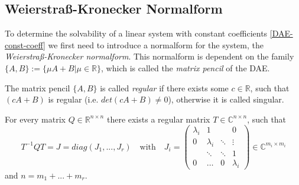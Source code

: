 \subsection{Weierstraß-Kronecker Normalform}
\label{chap:Weierstraß-Kronecker Normalform}

To determine the solvability of a linear system with constant coefficients \eqref{DAE-const-coeff} we first need to introduce a normalform for the system, the \emph{Weierstraß-Kronecker normalform}. This normalform is dependent on the family $\{A,B\} := \{ \mu A+B|\mu \in \mathbb{R} \}$, which is called the  \emph{matrix pencil} of the DAE.

\begin{definition}
	The matrix pencil $\{ A,B\}$ is called \emph{regular} if there exists some $c \in \mathbb{R}$, such that $(cA+B)$ is regular (i.e. $det(cA+B) \neq 0$), otherwise it is called singular.
\end{definition}

\begin{theorem}
	For every matrix $Q \in \mathbb{R}^{n \times n}$ there exists a regular matrix $T \in \mathbb{C}^{n \times n}$, such that
	\begin{displaymath}
		T^{-1}QT = J = diag(J_1, ..., J_r) \quad \text{with} \quad J_i = 
		\left(
		\begin{matrix}
			\lambda_i & 1 & & 0 \\
			0 & \lambda_i & \ddots & \vdots \\
			& \ddots & \ddots & 1 \\
			0 & \hdots & 0 & \lambda_i
		\end{matrix}
		\right)
		\in \mathbb{C}^{m_i \times m_i}
	\end{displaymath} 
	and $n = m_1 + ... + m_r$.
\end{theorem}

